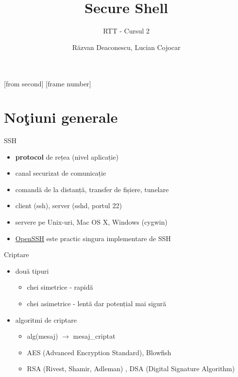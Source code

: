\documentclass{beamer}
\title[Secure Shell]{Secure Shell}
\subtitle{RTT - Cursul 2}
\institute{ROSEdu}
\author{Răzvan Deaconescu, Lucian Cojocar}
\begin{document}
[from second]
[frame number]

\frame{\titlepage}

\frame{\tableofcontents}

\section{No\c{t}iuni generale}

\frame{\tableofcontents[currentsection]}

\begin{frame}{SSH}
  \begin{itemize}
    \item \textbf{protocol} de rețea (nivel aplicație)
    \item canal securizat de comunicație
    \item comandă de la distanță, transfer de fișiere, tunelare
    \item client (ssh), server (sshd, portul 22)
    \item servere pe Unix-uri, Mac OS X, Windows (cygwin)
    \item \href{http://www.openssh.com/}{OpenSSH} este practic singura
implementare de SSH
  \end{itemize}
\end{frame}

\begin{frame}{Criptare}
  \begin{itemize}
    \item două tipuri
      \begin{itemize}
        \item chei simetrice - rapidă
        \item chei asimetrice - lentă dar potențial mai sigură
      \end{itemize}
    \item algoritmi de criptare
       \begin{itemize}
         \item alg(mesaj) $\rightarrow$ mesaj\_criptat
         \item AES (Advanced Encryption Standard), Blowfish
         \item RSA (Rivest, Shamir, Adleman) , DSA (Digital Signature Algorithm)
       \end{itemize}
  \end{itemize}
\end{frame}
\end{document}
